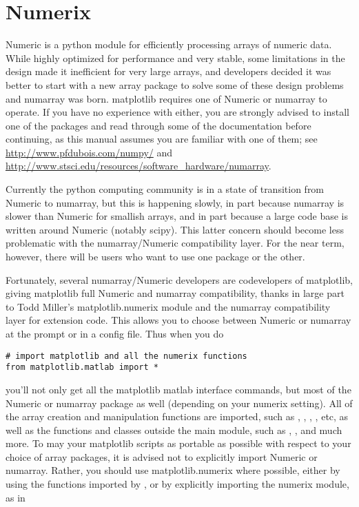 \documentclass[twoside]{book}
\begin{document}
\section{Numerix}
\label{sec:numerix}

Numeric is a python module for efficiently processing arrays of
numeric data.  While highly optimized for performance and very stable,
some limitations in the design made it inefficient for very large
arrays, and developers decided it was better to start with a new array
package to solve some of these design problems and numarray was born.
matplotlib requires one of Numeric or numarray to operate.  If you
have no experience with either, you are strongly advised to install
one of the packages and read through some of the documentation before
continuing, as this manual assumes you are familiar with one of them;
see \url{http://www.pfdubois.com/numpy/} and
\url{http://www.stsci.edu/resources/software_hardware/numarray}.

Currently the python computing community is in a state of transition
from Numeric to numarray, but this is happening slowly, in part
because numarray is slower than Numeric for smallish arrays, and in
part because a large code base is written around Numeric (notably
scipy).  This latter concern should become less problematic with the
numarray/Numeric compatibility layer.  For the near term, however,
there will be users who want to use one package or the other.

Fortunately, several numarray/Numeric developers are codevelopers of
matplotlib, giving matplotlib full Numeric and numarray compatibility,
thanks in large part to Todd Miller's matplotlib.numerix module and
the numarray compatibility layer for extension code.  This allows you
to choose between Numeric or numarray at the prompt or in a config
file.  Thus when you do

\begin{lstlisting}
# import matplotlib and all the numerix functions
from matplotlib.matlab import *
\end{lstlisting}

\noindent you'll not only get all the matplotlib matlab interface
commands, but most of the Numeric or numarray package as well
(depending on your numerix setting).  All of the array creation and
manipulation functions are imported, such as ,
, , , etc, as well as the
functions and classes outside the main module, such as ,
,  and much more.  To may your matplotlib
scripts as portable as possible with respect to your choice of array
packages, it is advised not to explicitly import Numeric or numarray.
Rather, you should use matplotlib.numerix where possible, either by
using the functions imported by , or by
explicitly importing the numerix module, as in 
\end{document}
